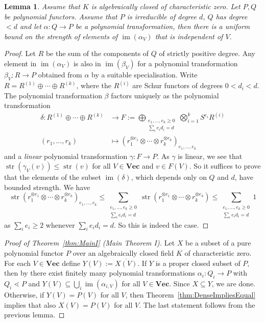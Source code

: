 \documentclass{amsart}
\theoremstyle{plain}
\newtheorem{lm}[thm]{Lemma}
\theoremstyle{definition}
\DeclareMathOperator{\im}{im}
\DeclareMathOperator{\str}{str}
\renewcommand{\Vec}{\mathbf{Vec}}
\begin{document}
\begin{lm}
Assume that $K$ is algebraically closed of characteristic zero. Let $P,Q$ be polynomial functors. Assume that $P$ is irreducible of degree $d$, $Q$ has degree $<d$ and let $\alpha\colon Q \to P$ be a polynomial
transformation, then there is a uniform bound on the strength of elements
of $\im(\alpha_V)$ that is independent of $V$.
\end{lm}
\begin{proof}
Let $R$ be the sum of the components of $Q$ of strictly positive degree. Any
element in $\im(\alpha_V)$ is also in $\im(\beta_{V})$ for a
polynomial transformation $\beta_V\colon R\to P$ obtained
from $\alpha$ by a suitable specialisation. Write $R=R^{(1)} \oplus\cdots \oplus R^{(k)}$, where the $R^{(i)}$ are Schur functors of degrees $0<d_i<d$. The
polynomial transformation $\beta$ factors uniquely as the polynomial transformation
\begin{align*}
\delta\colon R^{(1)} \oplus\cdots \oplus R^{(k)}&\to F:=\bigoplus_{\substack{e_1,\ldots,e_k\geq0\\\sum_i e_i d_i=d}} \bigotimes_{i=1}^k S^{e_i} R^{(i)} \\
(r_1,\ldots,r_k)&\mapsto(r_1^{\otimes e_1}\otimes\cdots\otimes r_k^{\otimes e_k})_{e_1,\ldots,e_k}
\end{align*}
and a {\em linear} polynomial transformation $\gamma\colon F \to P$. As $\gamma$ is linear, we see that $\str(\gamma_V(v))\leq \str(v)$ for all $V\in\Vec$ and $v\in F(V)$. So it suffices to prove that the elements of the subset $\im(\delta)$, which depends only on $Q$ and $d$, have bounded strength. We have
\[
\str(r_1^{\otimes e_1}\otimes\cdots\otimes r_k^{\otimes e_k})_{e_1,\ldots,e_k}\leq \sum_{\substack{e_1,\ldots,e_k\geq0\\\sum_i e_i d_i=d}}\str(r_1^{\otimes e_1}\otimes\cdots\otimes r_k^{\otimes e_k})\leq\sum_{\substack{e_1,\ldots,e_k\geq0\\\sum_i e_i d_i=d}}1
\]
as $\sum_i e_i\geq 2$ whenever $\sum_i e_id_i=d$. So this is indeed the case.
\end{proof}

\begin{proof}[Proof of Theorem~\ref{thm:MainI} (Main Theorem I)]
Let $X$ be a subset of a pure polynomial functor $P$ over an algebraically
closed field $K$ of characteristic zero. For each
$V \in \Vec$ define $Y(V):=\overline{X(V)}$. If $Y$ is a proper closed
subset of $P$, then by \cite[Theorem 4.2.5]{B:thesis} there exist finitely many polynomial
transformations $\alpha_i\colon Q_i \to P$ with $Q_i\lessdot P$
and $Y(V) \subseteq \bigcup_i \im(\alpha_{i,V})$ for all $V\in\Vec$.
Since $X \subseteq Y$, we are done. Otherwise, if $Y(V)=P(V)$
for all $V$, then Theorem~\ref{thm:DenseImpliesEqual} implies that also
$X(V)=P(V)$ for all $V$. The last statement follows from the previous lemma.
\end{proof}
\end{document}
